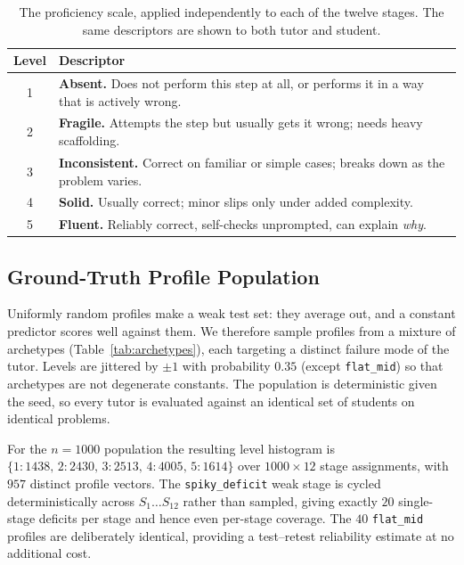 \begin{table}[t]
\centering
\small
\begin{tabular}{@{}cp{5.6cm}@{}}
\toprule
\textbf{Level} & \textbf{Descriptor} \\
\midrule
1 & \textbf{Absent.} Does not perform this step at all, or performs it in a way that is actively wrong. \\
2 & \textbf{Fragile.} Attempts the step but usually gets it wrong; needs heavy scaffolding. \\
3 & \textbf{Inconsistent.} Correct on familiar or simple cases; breaks down as the problem varies. \\
4 & \textbf{Solid.} Usually correct; minor slips only under added complexity. \\
5 & \textbf{Fluent.} Reliably correct, self-checks unprompted, can explain \emph{why}. \\
\bottomrule
\end{tabular}
\caption{The proficiency scale, applied independently to each of the twelve
stages. The same descriptors are shown to both tutor and student.}
\label{tab:levels}
\end{table}

\subsection{Ground-Truth Profile Population}
\label{app:profiles}

Uniformly random profiles make a weak test set: they average out, and a
constant predictor scores well against them. We therefore sample profiles from
a mixture of archetypes (Table~\ref{tab:archetypes}), each targeting a distinct
failure mode of the tutor. Levels are jittered by $\pm 1$ with probability
$0.35$ (except \texttt{flat\_mid}) so that archetypes are not degenerate
constants. The population is deterministic given the seed, so every tutor is
evaluated against an identical set of students on identical problems.

For the $n{=}1000$ population the resulting level histogram is
$\{1{:}1438,\, 2{:}2430,\, 3{:}2513,\, 4{:}4005,\, 5{:}1614\}$ over
$1000 \times 12$ stage assignments, with $957$ distinct profile vectors. The
\texttt{spiky\_deficit} weak stage is cycled deterministically across
$S_1 \dots S_{12}$ rather than sampled, giving exactly $20$ single-stage
deficits per stage and hence even per-stage coverage. The $40$
\texttt{flat\_mid} profiles are deliberately identical, providing a
test--retest reliability estimate at no additional cost.

